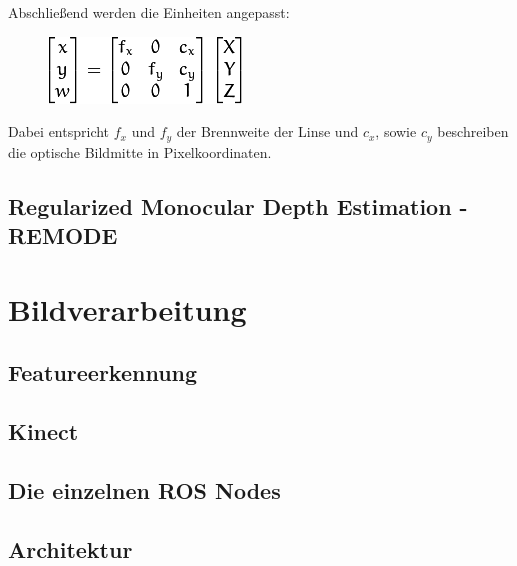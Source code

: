 Abschließend werden die Einheiten angepasst:

\begin{figure}[ht]
	\centering
	\includegraphics[scale=0.7]{Bilder/matrixEquation.png}
	\label{fig:radial}
\end{figure}

Dabei entspricht $f_x$ und $f_y$ der Brennweite der Linse und $c_x$, sowie $c_y$ beschreiben die optische Bildmitte in Pixelkoordinaten. \newline



\subsection{Regularized Monocular Depth Estimation - REMODE}








\section{Bildverarbeitung}
\label{Bildverarbeitung}

\subsection{Featureerkennung}
\subsection{Kinect}
\subsection{Die einzelnen ROS Nodes}
\subsection{Architektur}



